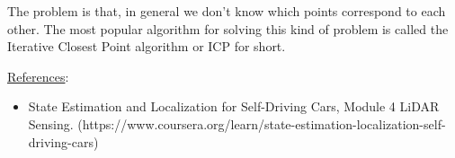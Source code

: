 The problem is that, in general we don't know which points correspond to each other. The most popular algorithm for solving this kind of problem is called the Iterative Closest Point algorithm or ICP for short. 

\underline{References}:
\begin{itemize}
    \item State Estimation and Localization for Self-Driving Cars, Module 4 LiDAR Sensing. (https://www.coursera.org/learn/state-estimation-localization-self-driving-cars)
\end{itemize}